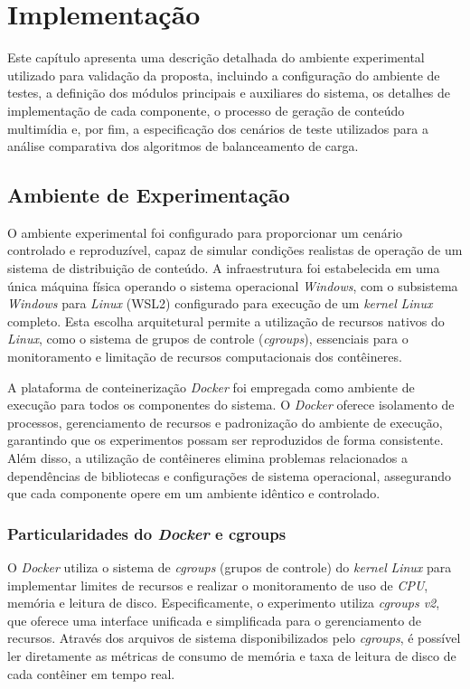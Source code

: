 \chapter{Implementação} \label{cap:Implementacao}

Este capítulo apresenta uma descrição detalhada do ambiente experimental utilizado para validação da proposta, incluindo a configuração do ambiente de testes, a definição dos módulos principais e auxiliares do sistema, os detalhes de implementação de cada componente, o processo de geração de conteúdo multimídia e, por fim, a especificação dos cenários de teste utilizados para a análise comparativa dos algoritmos de balanceamento de carga.

\section{Ambiente de Experimentação}

O ambiente experimental foi configurado para proporcionar um cenário controlado e reproduzível, capaz de simular condições realistas de operação de um sistema de distribuição de conteúdo. A infraestrutura foi estabelecida em uma única máquina física operando o sistema operacional \textit{Windows}, com o subsistema \textit{Windows} para \textit{Linux} (WSL2) configurado para execução de um \textit{kernel} \textit{Linux} completo. Esta escolha arquitetural permite a utilização de recursos nativos do \textit{Linux}, como o sistema de grupos de controle (\textit{cgroups}), essenciais para o monitoramento e limitação de recursos computacionais dos contêineres.

A plataforma de conteinerização \textit{Docker} foi empregada como ambiente de execução para todos os componentes do sistema. O \textit{Docker} oferece isolamento de processos, gerenciamento de recursos e padronização do ambiente de execução, garantindo que os experimentos possam ser reproduzidos de forma consistente. Além disso, a utilização de contêineres elimina problemas relacionados a dependências de bibliotecas e configurações de sistema operacional, assegurando que cada componente opere em um ambiente idêntico e controlado.

\subsection{Particularidades do \textit{Docker} e cgroups}

O \textit{Docker} utiliza o sistema de \textit{cgroups} (grupos de controle) do \textit{kernel} \textit{Linux} para implementar limites de recursos e realizar o monitoramento de uso de \textit{CPU}, memória e leitura de disco. Especificamente, o experimento utiliza \textit{cgroups v2}, que oferece uma interface unificada e simplificada para o gerenciamento de recursos. Através dos arquivos de sistema disponibilizados pelo \textit{cgroups}, é possível ler diretamente as métricas de consumo de memória e taxa de leitura de disco de cada contêiner em tempo real.

